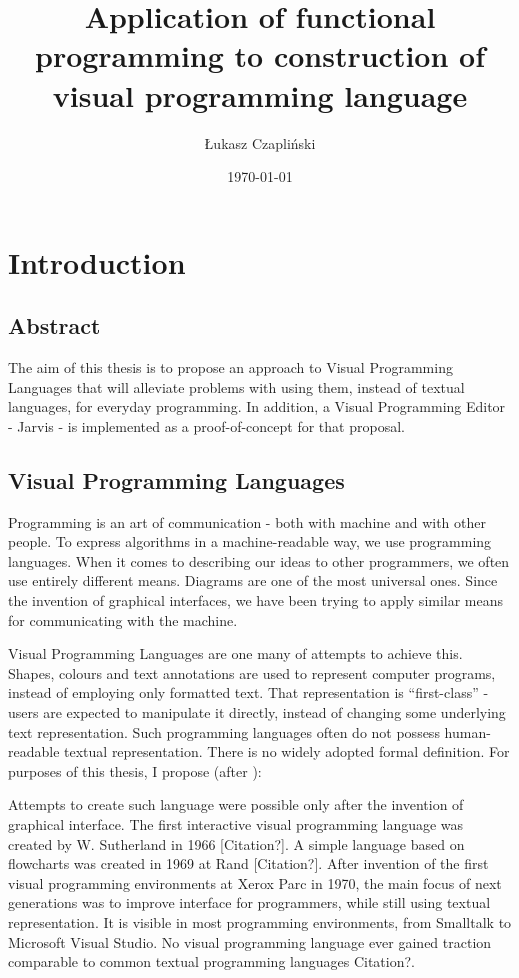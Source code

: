 \documentclass[11pt]{scrartcl}
\title{Application of functional programming to construction of visual programming language}
\author{Łukasz Czapliński}
\date{\today}
\begin{document}
\maketitle

\section{Introduction}
\subsection{Abstract}
The aim of this thesis is to propose an approach to  Visual Programming Languages that will alleviate problems with using them, instead of textual languages, for everyday programming. In addition, a Visual Programming Editor - Jarvis - is implemented as a proof-of-concept for that proposal.

\subsection{Visual Programming Languages}
Programming is an art of communication - both with machine and with other people.
To express algorithms in a machine-readable way, we use programming languages. When it comes to describing our ideas to other programmers, we often use entirely different means. Diagrams are one of the most universal ones. Since the invention of graphical interfaces, we have been trying to apply similar means for communicating with the machine.

Visual Programming Languages are one many of attempts to achieve this. Shapes, colours and text annotations are used to represent computer programs, instead of employing only formatted text. That representation is “first-class” - users are expected to manipulate it directly, instead of changing some underlying text representation. Such programming languages often do not possess human-readable textual representation. There is no widely adopted formal definition.  For purposes of this thesis, I propose (after \cite[Chapter 2]{nickerson1995visual}):

Attempts to create such language were possible only after the invention of graphical interface. The first interactive visual programming language was created by W. Sutherland in 1966 [Citation?]. A simple language based on flowcharts was created in 1969 at Rand [Citation?]. After invention of the first visual programming environments at Xerox Parc in 1970, the main focus of next generations was to improve interface for programmers, while still using textual representation. It is visible in most programming environments, from Smalltalk to Microsoft Visual Studio. No visual programming language ever gained traction comparable to common textual programming languages {Citation?}. 
\end{document}
